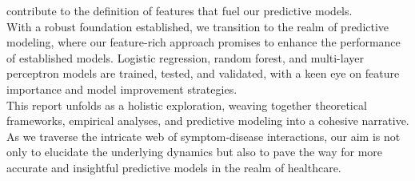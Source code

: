 contribute to the definition of features that fuel our predictive models.\\
With a robust foundation established, we transition to the realm of predictive modeling,
where our feature-rich approach promises to enhance the performance of established models.
Logistic regression, random forest, and multi-layer perceptron models are trained, tested, and validated,
with a keen eye on feature importance and model improvement strategies.\\
This report unfolds as a holistic exploration, weaving together theoretical frameworks, empirical analyses,
and predictive modeling into a cohesive narrative. As we traverse the intricate web of symptom-disease interactions,
our aim is not only to elucidate the underlying dynamics but also to pave the way for more accurate and insightful predictive models in the realm of healthcare.
